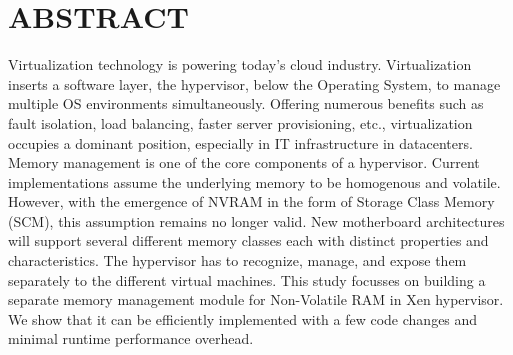 %
%
%

\chapter*{ABSTRACT}

\pagestyle{plain} %
\setcounter{page}{2}

\indent 

Virtualization technology is powering today's cloud industry. Virtualization inserts a software layer, the hypervisor, below the Operating System, to manage multiple OS environments simultaneously. Offering numerous benefits such as fault isolation, load balancing, faster server provisioning, etc., virtualization occupies a dominant position, especially in IT infrastructure in datacenters. Memory management is one of the core components of a hypervisor. Current implementations assume the underlying memory to be homogenous and volatile. However, with the emergence of NVRAM in the form of Storage Class Memory (SCM), this assumption remains no longer valid. New motherboard architectures will support several different memory classes each with distinct properties and characteristics. The hypervisor has to recognize, manage, and expose them separately to the different virtual machines. This study focusses on building a separate memory management module for Non-Volatile RAM in Xen hypervisor. We show that it can be efficiently implemented with a few code changes and minimal runtime performance overhead.
